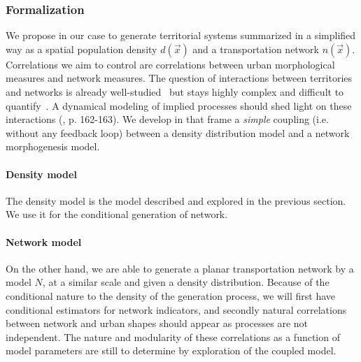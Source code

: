\subsubsection{Formalization}

We propose in our case to generate territorial systems summarized in a simplified way as a spatial population density $d(\vec{x})$ and a transportation network $n(\vec{x})$. Correlations we aim to control are correlations between urban morphological measures and network measures. The question of interactions between territories and networks is already well-studied~\cite{offner1996reseaux} but stays highly complex and difficult to quantify~\cite{offner1993effets}. A dynamical modeling of implied processes should shed light on these interactions (\cite{bretagnolle:tel-00459720}, p. 162-163). We develop in that frame a \emph{simple} coupling (i.e. without any feedback loop) between a density distribution model and a network morphogenesis model.



\paragraph{Density model}

The density model is the model described and explored in the previous section. We use it for the conditional generation of network.


\paragraph{Network model}


On the other hand, we are able to generate a planar transportation network by a model $N$, at a similar scale and given a density distribution. Because of the conditional nature to the density of the generation process, we will first have conditional estimators for network indicators, and secondly natural correlations between network and urban shapes should appear as processes are not independent. The nature and modularity of these correlations as a function of model parameters are still to determine by exploration of the coupled model.



